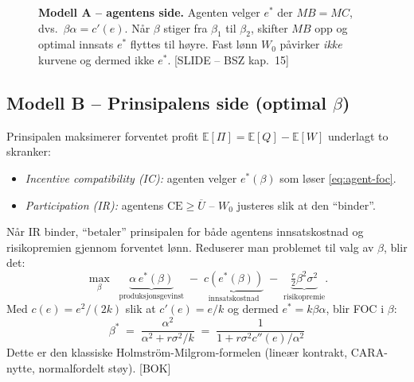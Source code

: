 \begin{figure}[H]
\centering
{}
\caption{\textbf{Modell A -- agentens side.} Agenten velger $e^{*}$ der $MB=MC$, dvs.\ $\beta\alpha=c'(e)$. Når $\beta$ stiger fra $\beta_1$ til $\beta_2$, skifter $MB$ opp og optimal innsats $e^{*}$ flyttes til høyre. Fast lønn $W_0$ påvirker \emph{ikke} kurvene og dermed ikke $e^{*}$. [SLIDE -- BSZ kap.\ 15]}
\end{figure}

\subsection*{Modell B -- Prinsipalens side (optimal $\beta$)}

Prinsipalen maksimerer forventet profit $\mathbb{E}[\Pi]=\mathbb{E}[Q]-\mathbb{E}[W]$ underlagt to skranker:
\begin{itemize}\setlength{\itemsep}{1pt}
\item \emph{Incentive compatibility (IC):} agenten velger $e^{*}(\beta)$ som løser \eqref{eq:agent-foc}.
\item \emph{Participation (IR):} agentens $\mathrm{CE}\ge \overline{U}$ -- $W_0$ justeres slik at den ``binder''.
\end{itemize}
Når IR binder, ``betaler'' prinsipalen for både agentens innsatskostnad og risikopremien gjennom forventet lønn. Reduserer man problemet til valg av $\beta$, blir det:
\[
\max_{\beta}\;\;\underbrace{\alpha\,e^{*}(\beta)}_{\text{produksjonsgevinst}}\;-\;\underbrace{c\!\left(e^{*}(\beta)\right)}_{\text{innsatskostnad}}\;-\;\underbrace{\tfrac{r}{2}\beta^{2}\sigma^{2}}_{\text{risikopremie}}.
\]
Med $c(e)=e^{2}/(2k)$ slik at $c'(e)=e/k$ og dermed $e^{*}=k\beta\alpha$, blir FOC i $\beta$:
\begin{equation}\label{eq:beta-star}
\boxed{\;\beta^{*}\;=\;\dfrac{\alpha^{2}}{\alpha^{2}+r\sigma^{2}/k}\;=\;\dfrac{1}{1+r\sigma^{2}c''(e)/\alpha^{2}}\;}
\end{equation}
Dette er den klassiske Holmström-Milgrom-formelen (lineær kontrakt, CARA-nytte, normalfordelt støy). [BOK]

